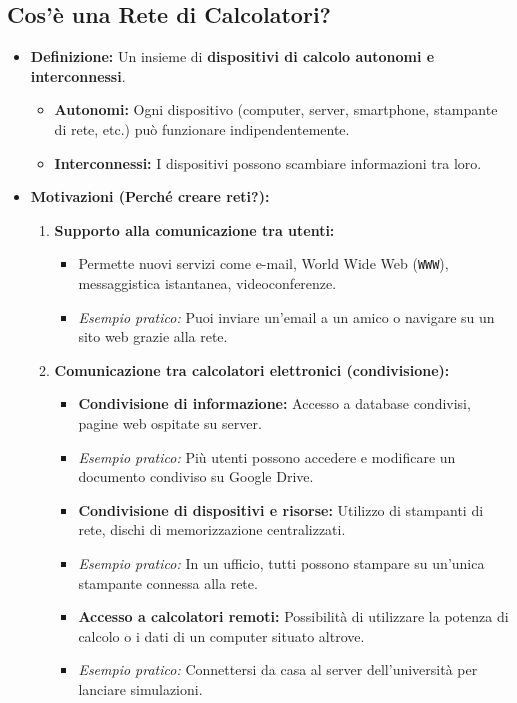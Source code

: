 \subsection{Cos'è una Rete di Calcolatori?}
\begin{itemize}
    \item \textbf{Definizione:} Un insieme di \textbf{dispositivi di calcolo autonomi e interconnessi}.
    \begin{itemize}
        \item \textbf{Autonomi:} Ogni dispositivo (computer, server, smartphone, stampante di rete, etc.) può funzionare indipendentemente.
        \item \textbf{Interconnessi:} I dispositivi possono scambiare informazioni tra loro.
    \end{itemize}
    \item \textbf{Motivazioni (Perché creare reti?):}
    \begin{enumerate}
        \item \textbf{Supporto alla comunicazione tra utenti:}
        \begin{itemize}
            \item Permette nuovi servizi come e-mail, World Wide Web (\texttt{WWW}), messaggistica istantanea, videoconferenze.
            \item \textit{Esempio pratico:} Puoi inviare un'email a un amico o navigare su un sito web grazie alla rete.
        \end{itemize}
        \item \textbf{Comunicazione tra calcolatori elettronici (condivisione):}
        \begin{itemize}
            \item \textbf{Condivisione di informazione:} Accesso a database condivisi, pagine web ospitate su server.
            \item \textit{Esempio pratico:} Più utenti possono accedere e modificare un documento condiviso su Google Drive.
            \item \textbf{Condivisione di dispositivi e risorse:} Utilizzo di stampanti di rete, dischi di memorizzazione centralizzati.
            \item \textit{Esempio pratico:} In un ufficio, tutti possono stampare su un'unica stampante connessa alla rete.
            \item \textbf{Accesso a calcolatori remoti:} Possibilità di utilizzare la potenza di calcolo o i dati di un computer situato altrove.
            \item \textit{Esempio pratico:} Connettersi da casa al server dell'università per lanciare simulazioni.

\end{itemize}
\end{enumerate}
\end{itemize}
